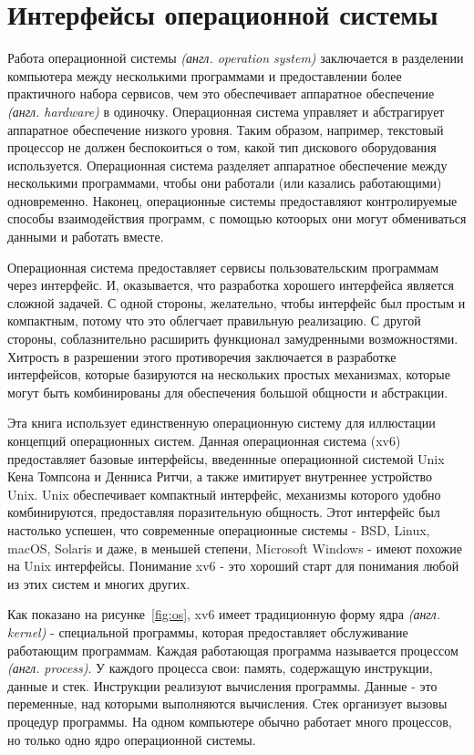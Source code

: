 \chapter{Интерфейсы операционной системы}
\label{CH:UNIX}

\iffalse
Работа операционной системы
\emph{(англ. operation system)} заключается
в разделении компьютера между несколькими программами
и предоставлении более практичного набора сервисов,
чем это обеспечивает аппаратное обеспечение
\emph{(англ. hardware)} в одиночку.
Операционная система управляет и абстрагирует
аппаратное обеспечение низкого уровня.
Таким образом, например,
текстовый процессор не должен беспокоиться о том,
какой тип дискового оборудования используется.
Операционная система разделяет
аппаратное обеспечение между несколькими программами,
чтобы они работали (или казались работающими) одновременно.
Наконец, операционные системы предоставляют
контролируемые способы взаимодействия программ,
с помощью котоорых они могут
обмениваться данными и работать вместе.

Операционная система предоставляет сервисы
пользовательским программам через интерфейс.
И, оказывается, что разработка хорошего интерфейса
является сложной задачей.
С одной стороны, желательно,
чтобы интерфейс был простым и компактным,
потому что это облегчает правильную реализацию.
С другой стороны, соблазнительно
расширить функционал замудренными возможностями.
Хитрость в разрешении этого противоречия
заключается в разработке интерфейсов,
которые базируются на нескольких простых механизмах,
которые могут быть комбинированы для обеспечения
большой общности и абстракции.

Эта книга использует единственную операционную систему
для иллюстации концепций операционных систем.
Данная операционная система (xv6)
предоставляет базовые интерфейсы,
введеннные операционной системой Unix~\cite{unix}
Кена Томпсона и Денниса Ритчи,
а также имитирует внутреннее устройство Unix.
Unix обеспечивает компактный интерфейс,
механизмы которого удобно комбинируются,
предоставляя поразительную общность.
Этот интерфейс был настолько успешен,
что современные операционные системы -
BSD, Linux, macOS, Solaris и даже,
в меньшей степени, Microsoft Windows -
имеют похожие на Unix интерфейсы.
Понимание xv6 - это хороший старт для понимания
любой из этих систем и многих других.

Как показано на рисунке~\ref{fig:os},
xv6 имеет традиционную форму ядра \emph{(англ. kernel)} -
специальной программы, которая предоставляет
обслуживание работающим программам.
Каждая работающая программа называется процессом \emph{(англ. process)}.
У каждого процесса свои:
память, содержащую инструкции, данные и стек.
Инструкции реализуют вычисления программы.
Данные - это переменные,
над которыми выполняются вычисления.
Стек организует вызовы процедур программы.
На одном компьютере обычно работает много процессов,
но только одно ядро операционной системы.

